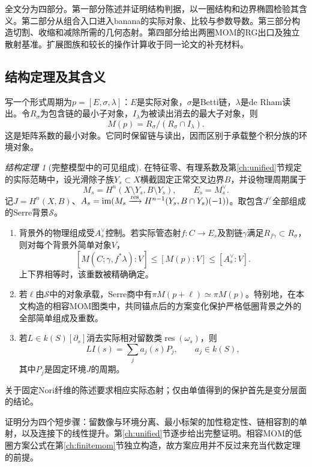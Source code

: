 \documentclass[11pt,a4paper,oneside]{ctexart}
\theoremstyle{cnplain}
\theoremstyle{definition}
\theoremstyle{remark}
\numberwithin{equation}{section}
\newtheorem*{maintheorem}{结构定理}
\begin{document}
全文分为四部分。第一部分陈述并证明结构判据，以一圈结构和边界椭圆检验其含义。第二部分从组合入口进入banana的实际对象、比较与参数导数。第三部分构造切割、收缩和减除所需的几何态射。第四部分给出两圈MOM的RG出口及独立散射基准。扩展图族和较长的操作计算收于同一论文的补充材料。

\subsection{结构定理及其含义}
写一个形式周期为$p=[E,\sigma,\lambda]$：$E$是实际对象，$\sigma$是Betti链，$\lambda$是de Rham读出。令$R_\sigma$为包含链的最小子对象，$I_\lambda$为被读出消去的最大子对象，则
\[
 M(p)=R_\sigma/(R_\sigma\cap I_\lambda).
\]
这是矩阵系数的最小对象。它同时保留链与读出，因而区别于承载整个积分族的环境对象。

\begin{maintheorem}[完整模型中的可见组成]
在特征零、有理系数及第\ref{ch:unified}节规定的实际范畴中，设光滑除子族$Y_s\subset X$横截固定正常交叉边界$B$，并设物理周期属于
\[
 M_s=H^n(X\setminus Y_s,B\setminus Y_s),\qquad E_s=M_s^\vee.
\]
记$J=H^n(X,B)$、$A_s=\operatorname{im}(M_s\xrightarrow{\rm res}H^{n-1}(Y_s,B\cap Y_s)(-1))$。取包含$J^\vee$全部组成的Serre背景$\mathcal S$。

\begin{enumerate}[label=(\roman*),leftmargin=2em]
\item 背景外的物理组成受$A_s^\vee$控制。若实际管态射$f:C\to E_s$及割链$\gamma$满足$R_{f\gamma}\subset R_\sigma$，则对每个背景外简单对象$V$，
\[
 [M(C;\gamma,f^*\lambda):V]\leq[M(p):V]\leq[A_s^\vee:V].
\]
上下界相等时，该重数被精确确定。
\item 若$\ell$由$\mathcal S$中的对象承载，Serre商中有$\pi M(p+\ell)\simeq\pi M(p)$。特别地，在本文构造的相容MOM图类中，共同锚点后的方案变化保护严格低圈背景之外的全部简单组成及重数。
\item 若$L\in k(S)[\partial_s]$消去实际相对留数类$\operatorname{res}(\omega_s)$，则
\[
 L I(s)=\sum_j a_j(s)P_j,\qquad a_j\in k(S),
\]
其中$P_j$是固定环境$J$的周期。
\end{enumerate}
关于固定Nori纤维的陈述要求相应实际态射；仅由单值得到的保护首先是变分层面的结论。
\end{maintheorem}

证明分为四个短步骤：留数像与环境分离、最小标架的加性稳定性、链相容割的单射，以及连接下的线性提升。第\ref{ch:unified}节逐步给出完整证明。相容MOM的低圈方案公式在第\ref{ch:finitemom}节独立构造，故方案应用并不反过来充当代数定理的前提。
\end{document}
